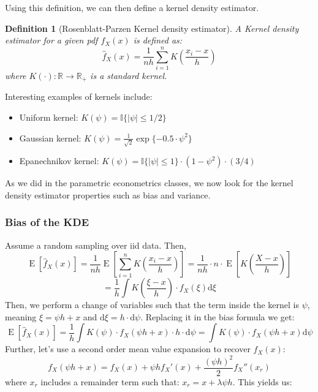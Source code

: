 \documentclass[12pt]{report}
\def\D{\mathrm{d}}
\newtheorem{definition}{Definition}[chapter]
\newcommand{\E}[1]{\operatorname{E}\left[#1\right]}
\def\D{\mathrm{d}}
\def\D{\mathrm{d}}
\begin{document}
Using this definition, we can then define a kernel density estimator.
\begin{definition}[Rosenblatt-Parzen Kernel density estimator]
A Kernel density estimator for a given pdf $f_X(x)$ is defined as: $$ \hat f_X(x) = \frac{1}{nh} \sum_{i=1}^{n} K\left(\frac{x_i - x}{h}\right) $$ where $K(\cdot):\mathbb{R}\to\mathbb{R}_+$ is a standard kernel.
\end{definition}
\newpage
Interesting examples of kernels include:\begin{itemize}
\item Uniform kernel: $K(\psi) = \mathbb{I}\{\vert\psi\vert\leq 1/2\}$
\item Gaussian kernel: $K(\psi) = \frac{1}{\sqrt{2}}\exp\{- 0.5 \cdot \psi^2\}$
\item Epanechnikov kernel: $K(\psi) = \mathbb{I}\{\vert\psi\vert\leq 1\}\cdot (1 - \psi^2)\cdot (3/4) $
\end{itemize}

As we did in the parametric econometrics classes, we now look for the kernel density estimator properties such as bias and variance.

\subsubsection{Bias of the KDE}

Assume a random sampling over iid data. Then, $$\E{\hat f_X(x)} = \frac{1}{nh}\E{\sum_{i=1}^{n} K\left(\frac{x_i - x}{h}\right)} = \frac{1}{nh} \cdot n \cdot \E{ K\left(\frac{X - x}{h}\right)} $$ $$ = \frac{1}{h} \int K\left(\frac{\xi - x}{h}\right)\cdot f_X(\xi) \D\xi  $$ Then, we perform a change of variables such that the term inside the kernel is $\psi$, meaning $\xi = \psi h + x$ and $\D \xi = h\cdot \D \psi $. Replacing it in the bias formula we get:$$\E{\hat f_X(x)} = \frac{1}{h} \int K\left(\psi\right)\cdot f_X(\psi h + x) \cdot h\cdot  \D \psi = \int K\left(\psi\right)\cdot f_X(\psi h + x) \D \psi$$
Further, let's use a second order  mean value expansion to recover $f_X(x)$: $$f_X(\psi h + x) = f_X(x) + \psi h f_X'(x) + \frac{(\psi h)^2}{2}	 f_X''(x_r) $$ where $x_r$ includes a remainder term such that: $x_r = x + \lambda\psi h$. This yields us: 
\end{document}
